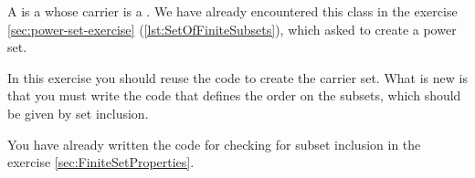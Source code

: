 


A  is a  whose carrier is a .
We have already encountered this class in the exercise \cref{sec:power-set-exercise} (\cref{lst:SetOfFiniteSubsets}), which asked to create a power set.

In this exercise you should reuse the code to create the carrier set.
What is new is that you must write the code that defines the order on the subsets, which should be given by set inclusion.

You have already written the code for checking for subset inclusion in the exercise \cref{sec:FiniteSetProperties}.



